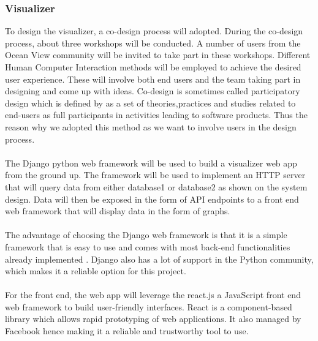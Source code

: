 \subsubsection{Visualizer}
To design the visualizer, a co-design process will adopted. During the co-design process, about three workshops  will be conducted. A number of users from the Ocean View community will be invited to take part in these workshops. Different Human Computer Interaction methods will be employed to achieve the desired user experience. These will involve both end users and the team taking part in designing and come up with ideas. Co-design is sometimes called participatory design which is defined by \cite{ctx2100202260004041} as a set of theories,practices and studies related to end-users as full participants in activities leading to software products. Thus the reason why we adopted this method as we want to involve users in the design process.
\paragraph{}
The  Django python web framework will be used to build a visualizer web app from the ground up. The framework will be used to implement an HTTP server that will query data from either database1 or database2 as shown on the system design. Data will then be exposed in the form of API endpoints to a front end web framework that will display data in the form of graphs.
\paragraph{}
The advantage of choosing the Django web framework is that it is a simple framework that is easy to use and comes with most back-end functionalities already implemented \cite{10.1007/978-3-540-87403-4_11}. Django also has a lot of support in the Python community, which makes it a reliable option for this project.
\paragraph{}
For the front end, the web app will leverage the react.js a JavaScript front end web framework to build user-friendly interfaces. React is a component-based library which allows rapid prototyping of web applications\cite{Gackenheimer2015}. It also managed by Facebook hence making it a reliable and trustworthy tool to use.
